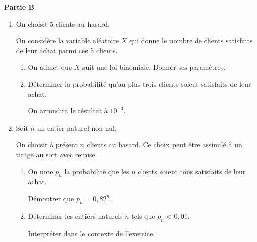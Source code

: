 \medskip

\textbf{Partie B}

\medskip

\begin{enumerate}
\item On choisit 5 clients au hasard. 

On considère la variable aléatoire $X$ qui donne le
nombre de clients satisfaits de leur achat parmi ces 5 clients.
	\begin{enumerate}
		\item On admet que $X$ suit une loi binomiale. Donner ses paramètres.
		\item Déterminer la probabilité qu'au plus trois clients soient satisfaits de leur achat.
		
On arrondira le résultat à $10^{-3}$.
	\end{enumerate}
\item Soit $n$ un entier naturel non nul.

On choisit à présent $n$ clients au hasard. Ce choix peut être assimilé à un tirage au sort avec remise.
	\begin{enumerate}
		\item On note $p_n$ la probabilité que les $n$ clients soient tous satisfaits de leur achat.
		
Démontrer que $p_n = 0,82^n$.
		\item Déterminer les entiers naturels $n$ tels que $p_n < 0,01$. 
		
Interpréter dans le contexte de l'exercice.
	\end{enumerate}
\end{enumerate}

\bigskip
